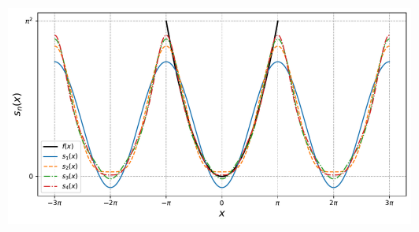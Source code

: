 \begin{ejemplo}
        \centering
        \includegraphics[width = 0.8\textwidth]{Figuras/EjemploFourier1.pdf}
        \label{fig:EjemploFourier1}
\end{ejemplo}





